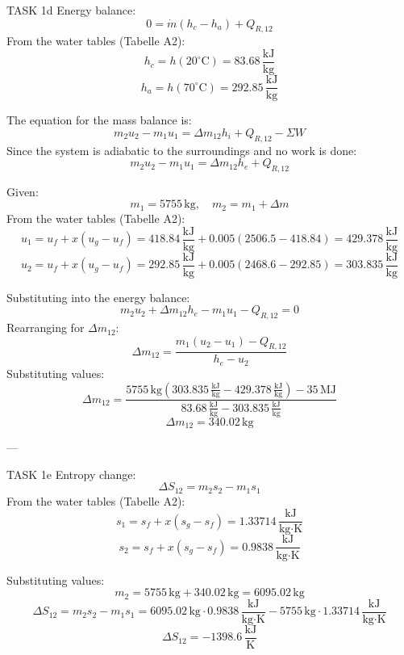 TASK 1d  
Energy balance:  
\[
0 = \dot{m}(h_c - h_a) + Q_{R,12}
\]  
From the water tables (Tabelle A2):  
\[
h_c = h(20^\circ\text{C}) = 83.68 \, \frac{\text{kJ}}{\text{kg}}
\]  
\[
h_a = h(70^\circ\text{C}) = 292.85 \, \frac{\text{kJ}}{\text{kg}}
\]  

The equation for the mass balance is:  
\[
m_2 u_2 - m_1 u_1 = \Delta m_{12} h_i + Q_{R,12} - \Sigma W
\]  
Since the system is adiabatic to the surroundings and no work is done:  
\[
m_2 u_2 - m_1 u_1 = \Delta m_{12} h_e + Q_{R,12}
\]  

Given:  
\[
m_1 = 5755 \, \text{kg}, \quad m_2 = m_1 + \Delta m
\]  
From the water tables (Tabelle A2):  
\[
u_1 = u_f + x(u_g - u_f) = 418.84 \, \frac{\text{kJ}}{\text{kg}} + 0.005(2506.5 - 418.84) = 429.378 \, \frac{\text{kJ}}{\text{kg}}
\]  
\[
u_2 = u_f + x(u_g - u_f) = 292.85 \, \frac{\text{kJ}}{\text{kg}} + 0.005(2468.6 - 292.85) = 303.835 \, \frac{\text{kJ}}{\text{kg}}
\]  

Substituting into the energy balance:  
\[
m_2 u_2 + \Delta m_{12} h_e - m_1 u_1 - Q_{R,12} = 0
\]  
Rearranging for \( \Delta m_{12} \):  
\[
\Delta m_{12} = \frac{m_1 (u_2 - u_1) - Q_{R,12}}{h_e - u_2}
\]  
Substituting values:  
\[
\Delta m_{12} = \frac{5755 \, \text{kg} (303.835 \, \frac{\text{kJ}}{\text{kg}} - 429.378 \, \frac{\text{kJ}}{\text{kg}}) - 35 \, \text{MJ}}{83.68 \, \frac{\text{kJ}}{\text{kg}} - 303.835 \, \frac{\text{kJ}}{\text{kg}}}
\]  
\[
\Delta m_{12} = 340.02 \, \text{kg}
\]  

---

TASK 1e  
Entropy change:  
\[
\Delta S_{12} = m_2 s_2 - m_1 s_1
\]  
From the water tables (Tabelle A2):  
\[
s_1 = s_f + x(s_g - s_f) = 1.33714 \, \frac{\text{kJ}}{\text{kg·K}}
\]  
\[
s_2 = s_f + x(s_g - s_f) = 0.9838 \, \frac{\text{kJ}}{\text{kg·K}}
\]  

Substituting values:  
\[
m_2 = 5755 \, \text{kg} + 340.02 \, \text{kg} = 6095.02 \, \text{kg}
\]  
\[
\Delta S_{12} = m_2 s_2 - m_1 s_1 = 6095.02 \, \text{kg} \cdot 0.9838 \, \frac{\text{kJ}}{\text{kg·K}} - 5755 \, \text{kg} \cdot 1.33714 \, \frac{\text{kJ}}{\text{kg·K}}
\]  
\[
\Delta S_{12} = -1398.6 \, \frac{\text{kJ}}{\text{K}}
\]